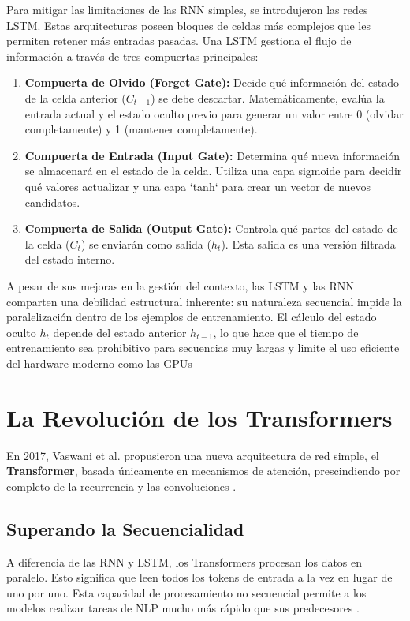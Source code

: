 \documentclass[11pt, a4paper]{article}
\begin{document}
Para mitigar las limitaciones de las RNN simples, se introdujeron las redes LSTM. Estas arquitecturas poseen bloques de celdas más complejos que les permiten retener más entradas pasadas.
 Una LSTM gestiona el flujo de información a través de tres compuertas principales:
\begin{enumerate}
    \item \textbf{Compuerta de Olvido (Forget Gate):} Decide qué información del estado de la celda anterior ($C_{t-1}$) se debe descartar. Matemáticamente, evalúa la entrada actual y el estado oculto previo para generar un valor entre 0 (olvidar completamente) y 1 (mantener completamente).
    
    \item \textbf{Compuerta de Entrada (Input Gate):} Determina qué nueva información se almacenará en el estado de la celda. Utiliza una capa sigmoide para decidir qué valores actualizar y una capa `tanh` para crear un vector de nuevos candidatos.
    
    \item \textbf{Compuerta de Salida (Output Gate):} Controla qué partes del estado de la celda ($C_t$) se enviarán como salida ($h_t$). Esta salida es una versión filtrada del estado interno.
\end{enumerate}

A pesar de sus mejoras en la gestión del contexto, las LSTM y las RNN comparten una debilidad estructural inherente: su naturaleza secuencial impide la paralelización dentro de los ejemplos
de entrenamiento. El cálculo del estado oculto $h_t$ depende del estado anterior $h_{t-1}$, lo que hace que el tiempo de entrenamiento sea prohibitivo para secuencias muy largas y limite el 
uso eficiente del hardware moderno como las GPUs

\section{La Revolución de los Transformers}

En 2017, Vaswani et al. propusieron una nueva arquitectura de red simple, el \textbf{Transformer}, basada únicamente en mecanismos de atención, prescindiendo por completo de la recurrencia 
y las convoluciones \parencite{vaswani2017}.

\subsection{Superando la Secuencialidad}
A diferencia de las RNN y LSTM, los Transformers procesan los datos en paralelo. Esto significa que leen todos los tokens de entrada a la vez en lugar de uno por uno. Esta capacidad de 
procesamiento no secuencial permite a los modelos realizar tareas de NLP mucho más rápido que sus predecesores \parencite{nvidia2023}.
\end{document}
